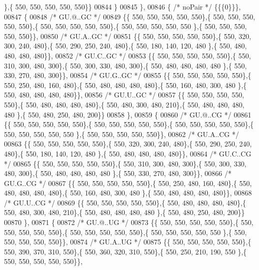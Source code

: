 \begin{DoxyCode}
      \},\{ 550, 550, 550, 550, 550\}\}
00844 \}
00845 \},
00846 \{ \textcolor{comment}{/* noPair */} \{\{\{0\}\}\},
00847 \{
00848 \textcolor{comment}{/* GU.@..GC */}
00849 \{\{ 550, 550, 550, 550, 550\},\{ 550, 550, 550, 550, 550\},\{ 550, 550, 550, 550, 550\},\{ 550, 550, 550, 550, 550
      \},\{ 550, 550, 550, 550, 550\}\},
00850 \textcolor{comment}{/* GU.A..GC */}
00851 \{\{ 550, 550, 550, 550, 550\},\{ 550, 320, 300, 240, 480\},\{ 550, 290, 250, 240, 480\},\{ 550, 180, 140, 120, 480
      \},\{ 550, 480, 480, 480, 480\}\},
00852 \textcolor{comment}{/* GU.C..GC */}
00853 \{\{ 550, 550, 550, 550, 550\},\{ 550, 310, 300, 480, 300\},\{ 550, 300, 330, 480, 300\},\{ 550, 480, 480, 480, 480
      \},\{ 550, 330, 270, 480, 300\}\},
00854 \textcolor{comment}{/* GU.G..GC */}
00855 \{\{ 550, 550, 550, 550, 550\},\{ 550, 250, 480, 160, 480\},\{ 550, 480, 480, 480, 480\},\{ 550, 160, 480, 300, 480
      \},\{ 550, 480, 480, 480, 480\}\},
00856 \textcolor{comment}{/* GU.U..GC */}
00857 \{\{ 550, 550, 550, 550, 550\},\{ 550, 480, 480, 480, 480\},\{ 550, 480, 300, 480, 210\},\{ 550, 480, 480, 480, 480
      \},\{ 550, 480, 250, 480, 200\}\}
00858 \},
00859 \{
00860 \textcolor{comment}{/* GU.@..CG */}
00861 \{\{ 550, 550, 550, 550, 550\},\{ 550, 550, 550, 550, 550\},\{ 550, 550, 550, 550, 550\},\{ 550, 550, 550, 550, 550
      \},\{ 550, 550, 550, 550, 550\}\},
00862 \textcolor{comment}{/* GU.A..CG */}
00863 \{\{ 550, 550, 550, 550, 550\},\{ 550, 320, 300, 240, 480\},\{ 550, 290, 250, 240, 480\},\{ 550, 180, 140, 120, 480
      \},\{ 550, 480, 480, 480, 480\}\},
00864 \textcolor{comment}{/* GU.C..CG */}
00865 \{\{ 550, 550, 550, 550, 550\},\{ 550, 310, 300, 480, 300\},\{ 550, 300, 330, 480, 300\},\{ 550, 480, 480, 480, 480
      \},\{ 550, 330, 270, 480, 300\}\},
00866 \textcolor{comment}{/* GU.G..CG */}
00867 \{\{ 550, 550, 550, 550, 550\},\{ 550, 250, 480, 160, 480\},\{ 550, 480, 480, 480, 480\},\{ 550, 160, 480, 300, 480
      \},\{ 550, 480, 480, 480, 480\}\},
00868 \textcolor{comment}{/* GU.U..CG */}
00869 \{\{ 550, 550, 550, 550, 550\},\{ 550, 480, 480, 480, 480\},\{ 550, 480, 300, 480, 210\},\{ 550, 480, 480, 480, 480
      \},\{ 550, 480, 250, 480, 200\}\}
00870 \},
00871 \{
00872 \textcolor{comment}{/* GU.@..UG */}
00873 \{\{ 550, 550, 550, 550, 550\},\{ 550, 550, 550, 550, 550\},\{ 550, 550, 550, 550, 550\},\{ 550, 550, 550, 550, 550
      \},\{ 550, 550, 550, 550, 550\}\},
00874 \textcolor{comment}{/* GU.A..UG */}
00875 \{\{ 550, 550, 550, 550, 550\},\{ 550, 390, 370, 310, 550\},\{ 550, 360, 320, 310, 550\},\{ 550, 250, 210, 190, 550
      \},\{ 550, 550, 550, 550, 550\}\},

\end{DoxyCode}

